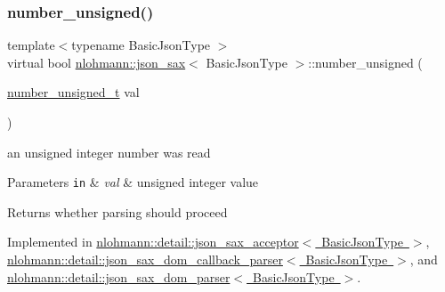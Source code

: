 \subsubsection{\texorpdfstring{number\+\_\+unsigned()}{number\_unsigned()}}
{\footnotesize\ttfamily template$<$typename Basic\+Json\+Type $>$ \\
virtual bool \mbox{\hyperlink{structnlohmann_1_1json__sax}{nlohmann\+::json\+\_\+sax}}$<$ Basic\+Json\+Type $>$\+::number\+\_\+unsigned (\begin{DoxyParamCaption}\item[{\mbox{\hyperlink{structnlohmann_1_1json__sax_a32028cc056ae0f43aaae331cdbbbf856}{number\+\_\+unsigned\+\_\+t}}}]{val }\end{DoxyParamCaption})\hspace{0.3cm}{\ttfamily [pure virtual]}}



an unsigned integer number was read 


\begin{DoxyParams}[1]{Parameters}
\mbox{\tt in}  & {\em val} & unsigned integer value \\
\hline
\end{DoxyParams}
\begin{DoxyReturn}{Returns}
whether parsing should proceed 
\end{DoxyReturn}


Implemented in \mbox{\hyperlink{classnlohmann_1_1detail_1_1json__sax__acceptor_a0759eb1ea812c4cfdf42065dd7f4c71b}{nlohmann\+::detail\+::json\+\_\+sax\+\_\+acceptor$<$ Basic\+Json\+Type $>$}}, \mbox{\hyperlink{classnlohmann_1_1detail_1_1json__sax__dom__callback__parser_abdbdf0d6cd07a997217ce74df8a42493}{nlohmann\+::detail\+::json\+\_\+sax\+\_\+dom\+\_\+callback\+\_\+parser$<$ Basic\+Json\+Type $>$}}, and \mbox{\hyperlink{classnlohmann_1_1detail_1_1json__sax__dom__parser_a5140b219d7e4c291ca24d7d736798062}{nlohmann\+::detail\+::json\+\_\+sax\+\_\+dom\+\_\+parser$<$ Basic\+Json\+Type $>$}}.

\mbox{\label{structnlohmann_1_1json__sax_a60287e3bd85f489e04c83f7e3b76e613}} 
